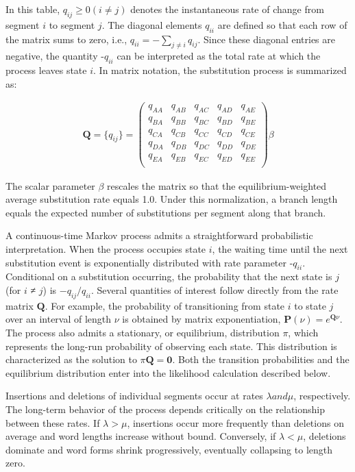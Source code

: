 \documentclass[numsec,webpdf,modern,large,namedate]{oup-authoring-template}
\begin{document}
In this table, $q_{ij}\geq 0 (i\neq j)$ denotes the instantaneous rate of change from segment $i$ to segment $j$. The diagonal elements $q_{ii}$ are defined so that each row of the matrix sums to zero, i.e., $q_{ii}= - \sum _{j\neq i}{q_{ij}}$. Since these diagonal entries are negative, the quantity -$q_{ii}$ can be interpreted as the total rate at which the process leaves state $i$. In matrix notation, the substitution process is summarized as:

\begin{align}
\mathbf{Q}= \{q_{ij}\}= \left(\begin{array}{ccccc}
q_{AA} & q_{AB} & q_{AC} & q_{AD} & q_{AE}\\
q_{BA} & q_{BB} & q_{BC} & q_{BD} & q_{BE}\\
q_{CA} & q_{CB} & q_{CC} & q_{CD} & q_{CE}\\
q_{DA} & q_{DB} & q_{DC} & q_{DD} & q_{DE}\\
q_{EA} & q_{EB} & q_{EC} & q_{ED} & q_{EE}\\
\end{array}\right) \beta 
\end{align}

The scalar parameter $\beta $ rescales the matrix so that the equilibrium-weighted average substitution rate equals 1.0. Under this normalization, a branch length equals the expected number of substitutions per segment along that branch. 

A continuous-time Markov process admits a straightforward probabilistic interpretation. When the process occupies state $i$, the waiting time until the next substitution event is exponentially distributed with rate parameter -$q_{ii}$. Conditional on a substitution occurring, the probability that the next state is $j$ (for $i$ ≠ $j$) is $- q_{ij}/ q_{ii}$. Several quantities of interest follow directly from the rate matrix $\mathbf{Q}$. For example, the probability of transitioning from state $i$ to state $j$ over an interval of length $\nu $ is obtained by matrix exponentiation, $\mathbf{P}(\nu )= e^{\mathbf{Q}\nu }$. The process also admits a stationary, or equilibrium, distribution $\pi $, which represents the long-run probability of observing each state. This distribution is characterized as the solution to $\pi \mathbf{Q}= \mathbf{0}$. Both the transition probabilities and the equilibrium distribution enter into the likelihood calculation described below. 

Insertions and deletions of individual segments occur at rates $\lambda  and \mu $, respectively. The long-term behavior of the process depends critically on the relationship between these rates. If $\lambda > \mu $, insertions occur more frequently than deletions on average and word lengths increase without bound. Conversely, if $\lambda < \mu $, deletions dominate and word forms shrink progressively, eventually collapsing to length zero. 
\end{document}
